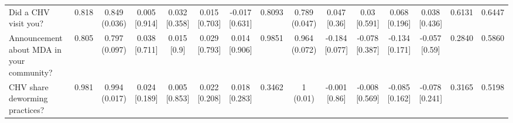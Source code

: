 {\begin{tabular}[t]{lcccccccccccccc}
\addlinespace[0.3em]
\hline
\multicolumn{15}{l}{\textit{\textbf{Panel D: Implementation, $N=2,659$}}}\\
\hline
\hspace{1em}Did a CHV visit you? & 0.818 & \makecell[c]{0.849\\(0.036)} & \makecell[c]{0.005\\{[0.914]}} & \makecell[c]{0.032\\{[0.358]}} & \makecell[c]{0.015\\{[0.703]}} & \makecell[c]{-0.017\\{[0.631]}} & 0.8093 & \makecell[c]{0.789\\(0.047)} & \makecell[c]{0.047\\{[0.36]}} & \makecell[c]{0.03\\{[0.591]}} & \makecell[c]{0.068\\{[0.196]}} & \makecell[c]{0.038\\{[0.436]}} & 0.6131 & 0.6447\\
\hspace{1em}Announcement about MDA in your community? & 0.805 & \makecell[c]{0.797\\(0.097)} & \makecell[c]{0.038\\{[0.711]}} & \makecell[c]{0.015\\{[0.9]}} & \makecell[c]{0.029\\{[0.793]}} & \makecell[c]{0.014\\{[0.906]}} & 0.9851 & \makecell[c]{0.964\\(0.072)} & \makecell[c]{-0.184\\{[0.077]}} & \makecell[c]{-0.078\\{[0.387]}} & \makecell[c]{-0.134\\{[0.171]}} & \makecell[c]{-0.057\\{[0.59]}} & 0.2840 & 0.5860\\
\hspace{1em}CHV share deworming practices? & 0.981 & \makecell[c]{0.994\\(0.017)} & \makecell[c]{0.024\\{[0.189]}} & \makecell[c]{0.005\\{[0.853]}} & \makecell[c]{0.022\\{[0.208]}} & \makecell[c]{0.018\\{[0.283]}} & 0.3462 & \makecell[c]{1\\(0.01)} & \makecell[c]{-0.001\\{[0.86]}} & \makecell[c]{-0.008\\{[0.569]}} & \makecell[c]{-0.085\\{[0.162]}} & \makecell[c]{-0.078\\{[0.241]}} & 0.3165 & 0.5198\\

\end{tabular}}
